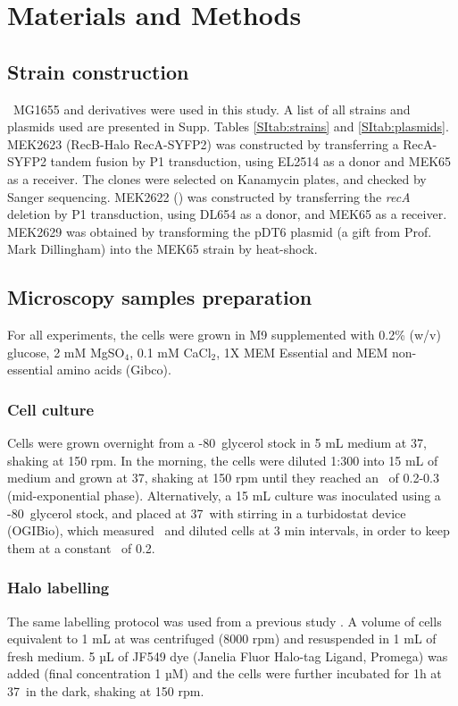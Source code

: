 \section*{Materials and Methods}

\subsection*{Strain construction}
\ecoli\ MG1655 and derivatives were used in this study. A list of all strains and plasmids used are presented in Supp. Tables \ref{SItab:strains} and \ref{SItab:plasmids}.
MEK2623 (RecB-Halo RecA-SYFP2) was constructed by transferring a RecA-SYFP2 tandem fusion by P1 transduction, using EL2514 \cite{Wiktor2021} as a donor and MEK65 \cite{Lepore2019a} as a receiver. The clones were selected on Kanamycin plates, and checked by Sanger sequencing. MEK2622 (\dreca) was constructed by transferring the \emph{recA} deletion by P1 transduction, using DL654 as a donor, and MEK65 as a receiver. MEK2629 was obtained by transforming the pDT6 plasmid (a gift from Prof. Mark Dillingham) into the MEK65 strain by heat-shock.

\subsection*{Microscopy samples preparation}
For all experiments, the cells were grown in M9 supplemented with 0.2\% (w/v) glucose, 2 mM MgSO$_4$, 0.1 mM CaCl$_2$, 1X MEM Essential and MEM non-essential amino acids (Gibco).
\subsubsection*{Cell culture}
Cells were grown overnight from a -80\celsius\ glycerol stock in 5 mL medium at 37\celsius, shaking at 150 rpm. In the morning, the cells were diluted 1:300 into 15 mL of medium and grown at 37\celsius, shaking at 150 rpm until they reached an \od\ of 0.2-0.3 (mid-exponential phase).
Alternatively, a 15 mL culture was inoculated using a -80\celsius\ glycerol stock, and placed at 37\celsius\ with stirring in a turbidostat device (OGIBio), which measured \od\ and diluted cells at 3 min intervals, in order to keep them at a constant \od\ of 0.2.
\subsubsection*{Halo labelling}
The same labelling protocol was used from a previous study \cite{Lepore2023}. A volume of cells equivalent to 1 mL at  was centrifuged (8000 rpm) and resuspended in 1 mL of fresh medium. 5 µL of JF549 dye (Janelia Fluor Halo-tag Ligand, Promega) was added (final concentration 1 µM) and the cells were further incubated for 1h at 37\celsius\ in the dark, shaking at 150 rpm.
